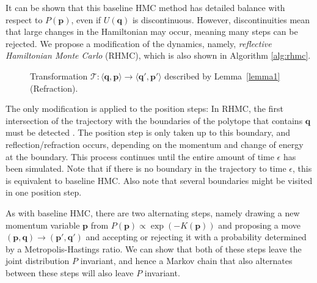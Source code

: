 \documentclass{article} %
\newcommand{\tuple}[1] {\langle #1 \rangle}
\newcommand{\bvec}[1]{\textbf{#1}}
\begin{document}
It can be shown that this baseline HMC method has detailed balance with respect to $P(\bvec{p})$, even if $U(\bvec{q})$ is discontinuous.  However, discontinuities mean that large changes in the Hamiltonian may occur, meaning many steps can be rejected.  We propose a modification of the dynamics, namely, \emph{reflective Hamiltonian Monte Carlo} (RHMC), which is also shown in Algorithm \ref{alg:rhmc}.  

\begin{figure}
\centering

\vspace{-30pt}
\caption{Transformation  $\mathcal{T}: \tuple{\bvec{q}, \bvec{p}} \rightarrow \tuple{\bvec{q}', \bvec{p}'}$ 
described by Lemma~\ref{lemma1} (Refraction).}
\label{Fig:sec1.BN3}
\end{figure}

The only modification is applied to the position steps: In RHMC, the first intersection of the trajectory with the boundaries of the polytope that contains $\bvec{q}$ must be detected \cite{pakman2014exact, pakman2013auxiliary}.  The position step is only taken up to this boundary, and reflection/refraction occurs, depending on the momentum and change of energy at the boundary.  This process continues until the entire amount of time $\epsilon$ has been simulated.  Note that if there is no boundary in the trajectory to time $\epsilon$, this is equivalent to baseline HMC.  Also note that several boundaries might be visited in one position step.

As with baseline HMC, there are two alternating steps, namely drawing a new momentum
variable $\bvec{p}$ from $P(\bvec{p})\propto\exp(-K(\bvec{p}))$ and proposing a move
$(\bvec{p}, \bvec{q})\rightarrow(\bvec{p}', \bvec{q}')$ and accepting or rejecting it with a probability
determined by a Metropolis-Hastings ratio. We can show that both of
these steps leave the joint distribution $P$ invariant, and hence
a Markov chain that also alternates between these steps will also
leave $P$ invariant.
\end{document}
